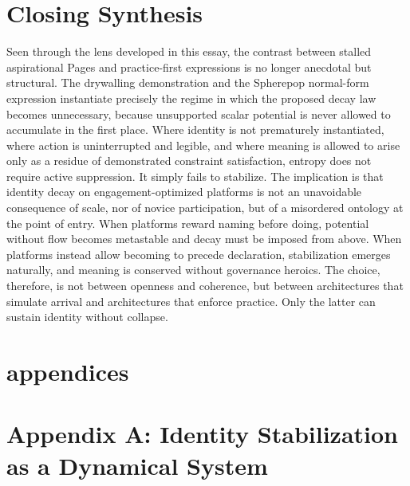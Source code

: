 \documentclass[11pt,oneside]{article}
\begin{document}
\section*{Closing Synthesis}

Seen through the lens developed in this essay, the contrast between stalled aspirational Pages and practice-first expressions is no longer anecdotal but structural. The drywalling demonstration and the Spherepop normal-form expression instantiate precisely the regime in which the proposed decay law becomes unnecessary, because unsupported scalar potential is never allowed to accumulate in the first place. Where identity is not prematurely instantiated, where action is uninterrupted and legible, and where meaning is allowed to arise only as a residue of demonstrated constraint satisfaction, entropy does not require active suppression. It simply fails to stabilize. The implication is that identity decay on engagement-optimized platforms is not an unavoidable consequence of scale, nor of novice participation, but of a misordered ontology at the point of entry. When platforms reward naming before doing, potential without flow becomes metastable and decay must be imposed from above. When platforms instead allow becoming to precede declaration, stabilization emerges naturally, and meaning is conserved without governance heroics. The choice, therefore, is not between openness and coherence, but between architectures that simulate arrival and architectures that enforce practice. Only the latter can sustain identity without collapse.

\newpage
\section*{appendices}

\appendix
\section{Appendix A: Identity Stabilization as a Dynamical System}
\end{document}
